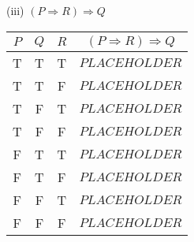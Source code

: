 \documentclass{article}
\begin{document}
(iii) $(P \Rightarrow R) \Rightarrow Q$\\
\begin{tabular}{|c|c|c|c|}
    \hline
    $P$ & $Q$ & $R$ & $(P \Rightarrow R) \Rightarrow Q$ \\
    \hline
    T   & T   & T   & $PLACEHOLDER$                     \\
    T   & T   & F   & $PLACEHOLDER$                     \\
    T   & F   & T   & $PLACEHOLDER$                     \\
    T   & F   & F   & $PLACEHOLDER$                     \\
    F   & T   & T   & $PLACEHOLDER$                     \\
    F   & T   & F   & $PLACEHOLDER$                     \\
    F   & F   & T   & $PLACEHOLDER$                     \\
    F   & F   & F   & $PLACEHOLDER$                     \\
    \hline
\end{tabular}
\end{document}
